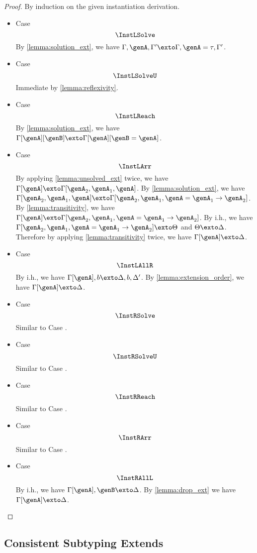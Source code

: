 \begin{proof}
  By induction on the given instantiation derivation.
  \begin{itemize}
  \item Case \[\InstLSolve\] By \cref{lemma:solution_ext}, we have $\Gamma, \genA, \Gamma' \exto \Gamma, \genA = \tau, \Gamma'$.
  \item Case \[\InstLSolveU\] Immediate by \cref{lemma:reflexivity}.
  \item Case \[\InstLReach\] By \cref{lemma:solution_ext}, we have $\Gamma[\genA][\genB] \exto \Gamma[\genA][\genB = \genA]$.
  \item Case \[\InstLArr\] By applying \cref{lemma:unsolved_ext} twice, we
    have $\Gamma[\genA] \exto \Gamma[\genA_2, \genA_1, \genA]$. By
    \cref{lemma:solution_ext}, we have $\Gamma[\genA_2, \genA_1, \genA]
    \exto \Gamma[\genA_2, \genA_1, \genA = \genA_1 \to \genA_2]$. By
    \cref{lemma:transitivity}, we have $\Gamma[\genA] \exto \Gamma[\genA_2,
    \genA_1, \genA = \genA_1 \to \genA_2]$. By i.h., we have $\Gamma[\genA_2,
    \genA_1, \genA = \genA_1 \to \genA_2] \exto \Theta$ and $\Theta \exto
    \Delta$. Therefore by applying \cref{lemma:transitivity} twice, we have
    $\Gamma[\genA] \exto \Delta$.
  \item Case \[\InstLAllR\] By i.h., we have $\Gamma[\genA], b \exto \Delta, b,
    \Delta'$. By \cref{lemma:extension_order}, we have $\Gamma[\genA] \exto \Delta$.
  \item Case \[\InstRSolve\] Similar to Case .
  \item Case \[\InstRSolveU\] Similar to Case .
  \item Case \[\InstRReach\] Similar to Case .
  \item Case \[\InstRArr\] Similar to Case .
  \item Case \[\InstRAllL\] By i.h., we have $\Gamma[\genA], \genB \exto
    \Delta$. By \cref{lemma:drop_ext} we have $\Gamma[\genA] \exto \Delta$.
  \end{itemize}

\end{proof}



\subsection{Consistent Subtyping Extends}


